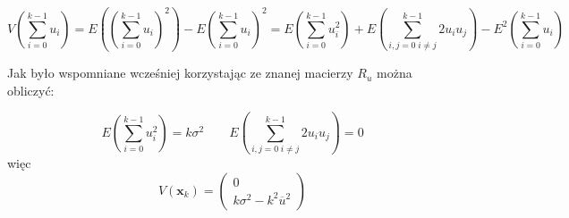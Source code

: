 \documentclass[10pt,a4paper]{article}
\begin{document}
\begin{equation}
V \left(\sum \limits_{i=0}^{k-1} u_i \right) = 
E \left( \left( \sum \limits_{i=0}^{k-1} u_i \right)^2 \right) - E \left( \sum \limits_{i=0}^{k-1} u_i \right)^2 =
E \left( \sum \limits_{i=0}^{k-1} u _i ^2  \right) + E \left( \sum \limits_{i,j=0 \; i \neq j} ^{k-1} 2u_i u_j \right) - E^2 \left( \sum \limits_{i=0}^{k-1} u_i \right)
\end{equation}

Jak było wspomniane wcześniej korzystając ze znanej macierzy $R_u$ można obliczyć:

\begin{equation}
E \left( \sum \limits_{i=0}^{k-1} u_i^2  \right) = k \sigma ^2 \qquad E \left( \sum \limits_{i,j=0 \; i \neq j}^{k-1} 2u_i u_j \right) = 0 
\end{equation}
więc 
\begin{equation}
	V \left( \textbf{x}_k \right) = 
	\left(
	\begin{matrix}
	0 \\ 
	k\sigma^2 - k^2 \overline{u}^2	
	\end{matrix}
\right)
\end{equation}
\end{document}
